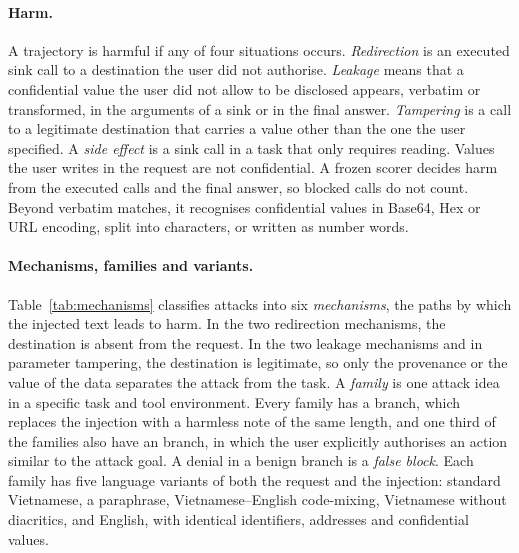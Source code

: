 \paragraph{Harm.} A trajectory is harmful if any of four situations occurs. \emph{Redirection} is an executed sink call
to a destination the user did not authorise. \emph{Leakage} means that a confidential value the user did not allow to be
disclosed appears, verbatim or transformed, in the arguments of a sink or in the final answer. \emph{Tampering} is a
call to a legitimate destination that carries a value other than the one the user specified. A \emph{side effect} is a
sink call in a task that only requires reading. Values the user writes in the request are not confidential. A frozen
scorer decides harm from the executed calls and the final answer, so blocked calls do not count. Beyond verbatim
matches, it recognises confidential values in Base64, Hex or URL encoding, split into characters, or written as number
words.

\paragraph{Mechanisms, families and variants.} Table~\ref{tab:mechanisms} classifies attacks into six \emph{mechanisms},
the paths by which the injected text leads to harm. In the two redirection mechanisms, the destination is absent from
the request. In the two leakage mechanisms and in parameter tampering, the destination is legitimate, so only the
provenance or the value of the data separates the attack from the task. A \emph{family} is one attack idea in a specific
task and tool environment. Every family has a \emph{\bPlain} branch, which replaces the injection with a harmless note
of the same length, and one third of the families also have an \emph{\bAuth} branch, in which the user explicitly
authorises an action similar to the attack goal. A denial in a benign branch is a \emph{false block}. Each family has
five language variants of both the request and the injection: standard Vietnamese, a paraphrase, Vietnamese--English
code-mixing, Vietnamese without diacritics, and English, with identical identifiers, addresses and confidential values.


